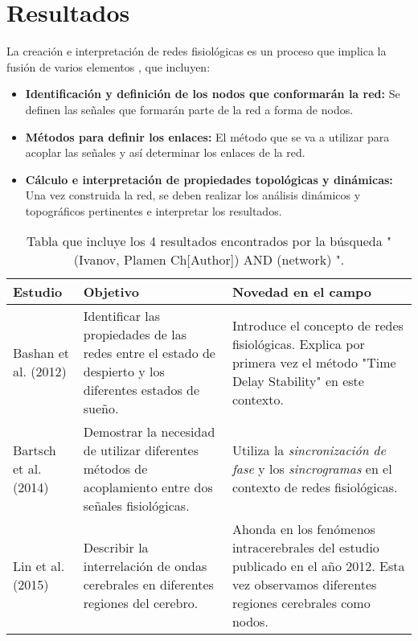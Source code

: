 \documentclass[twoside,twocolumn]{article}
\begin{document}
\section{Resultados}
La creación e interpretación de redes fisiológicas es un proceso que implica la fusión de varios elementos \cite{barajas2021sex}, que incluyen:
\begin{itemize}
  \item \textbf{Identificación y definición de los nodos que conformarán la red:} Se definen las señales que formarán parte de la red a forma de nodos.
  \item \textbf{Métodos para definir los enlaces:} El método que se va a utilizar para acoplar las señales y así determinar los enlaces de la red.
  \item \textbf{Cálculo e interpretación de propiedades topológicas y dinámicas:} \cite{adams2021gabaergic} Una vez construida la red, se deben realizar los análisis dinámicos y topográficos pertinentes e interpretar los resultados.
\end{itemize}
\onecolumn
\begin{center}
  \begin{table}[t]
    \begin{tabular}{|lp{6cm}p{6cm}|}
      \hline
      Estudio & Objetivo & Novedad en el campo \\
      \hline
      Bashan et al. (2012) \cite{bashan2012network} &
      Identificar las propiedades de las redes entre el estado de despierto y los diferentes estados de sueño.
      &
      Introduce el concepto de redes fisiológicas. Explica por primera vez el método "Time Delay Stability" en este contexto.
      \\ \hline
      Bartsch et al. (2014)\cite{bartsch2014coexisting} &
      Demostrar la necesidad de utilizar diferentes métodos de acoplamiento entre dos señales fisiológicas.
      &
      Utiliza la \textit{sincronización de fase} y los \textit{sincrogramas} en el contexto de redes fisiológicas.
      \\ \hline
      Lin et al. (2015) \cite{2015Plasticity} &
      Describir la interrelación de ondas cerebrales en diferentes regiones del cerebro.
      &
      Ahonda en los fenómenos intracerebrales del estudio publicado en el año 2012. Esta vez observamos diferentes regiones cerebrales como nodos.
      \\ \hline
    \end{tabular}
    \caption{Tabla que incluye los 4 resultados encontrados por la búsqueda "(Ivanov, Plamen Ch[Author]) AND (network) ".}
    \label{tab:plamenGroup}
  \end{table}
\end{center}
\end{document}
